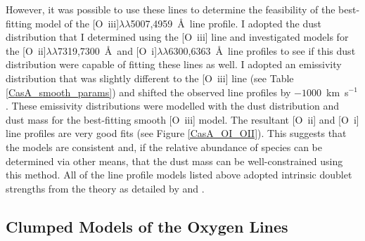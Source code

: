 However, it was possible to use these lines to determine the feasibility of the best-fitting model of the  [O~{\sc iii}]$\lambda\lambda$5007,4959~\AA\  line profile.  I adopted the dust distribution that I determined using the [O~{\sc iii}] line and investigated models for the [O~{\sc ii}]$\lambda\lambda$7319,7300~\AA\  and [O~{\sc i}]$\lambda\lambda$6300,6363~\AA\  line profiles to see if this dust distribution were capable of fitting these lines as well.  I adopted an emissivity distribution that was slightly different to the [O~{\sc iii}] line (see Table \ref{CasA_smooth_params}) and shifted the observed line profiles by $-1000$~km~s$^{-1}$.  These emissivity distributions were modelled with the dust distribution and dust mass for the best-fitting smooth [O~{\sc iii}] model.  The resultant [O~{\sc ii}] and [O~{\sc i}] line profiles are very good fits (see Figure \ref{CasA_OI_OII}).  This suggests that the models are consistent and, if the relative abundance of species can be determined via other means, that the dust mass can be well-constrained using this method.  All of the line profile models listed above adopted intrinsic doublet strengths from the theory as detailed by \citet{Zeippen1987} and \citet{Storey2000}.  



\subsection{Clumped Models of the Oxygen Lines}

